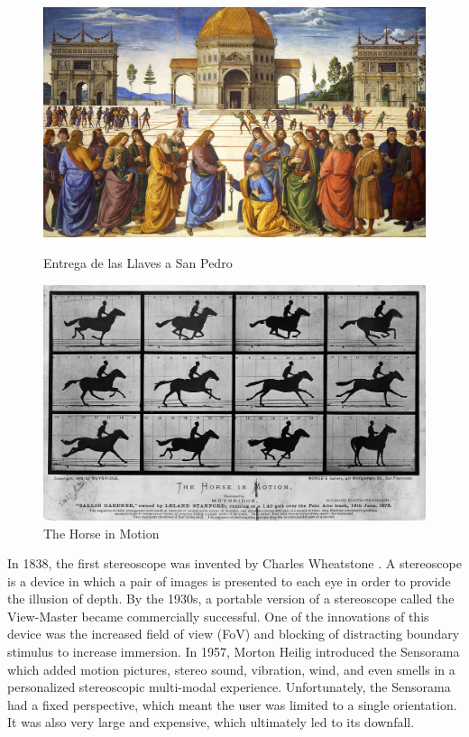 \begin{figure}[!htb]
  \includegraphics[width=\linewidth]{img/perugino.jpg}
  \caption{Entrega de las Llaves a San Pedro \cite{FileEntr24online}}\label{fig:san-pedro}
\endminipage\hfill
{}
  \includegraphics[width=\linewidth]{img/horse-in-mot.jpg}
  \caption{The Horse in Motion \cite{FileTheH64online}}\label{fig:horse-motion}
\endminipage
\end{figure}

In 1838, the first stereoscope was invented by Charles Wheatstone \cite{hemstrom2020comparison}. A stereoscope is a device in which a pair of images is presented to each eye in order to provide the illusion of depth. By the 1930s, a portable version of a stereoscope called the View-Master became commercially successful. One of the innovations of this device was the increased field of view (FoV) and blocking of distracting boundary stimulus to increase immersion. In 1957, Morton Heilig introduced the Sensorama which added motion pictures, stereo sound, vibration, wind, and even smells in a personalized stereoscopic multi-modal experience. Unfortunately, the Sensorama had a fixed perspective, which meant the user was limited to a single orientation. It was also very large and expensive, which ultimately led to its downfall.

